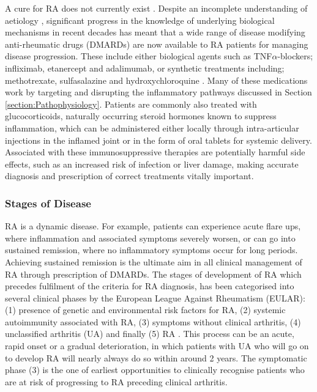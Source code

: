 \documentclass[twoside]{bhamthesis}
\theoremstyle{definition}
\begin{document}
A cure for RA does not currently exist \cite{el2002we}. Despite an incomplete understanding of aetiology \cite{el2002we}, significant progress in the knowledge of underlying biological mechanisms in recent decades has meant that a wide range of disease modifying anti-rheumatic drugs (DMARDs) are now available to RA patients for managing disease progression. These include either biological agents such as TNF$\alpha$-blockers; infliximab, etanercept and adalimumab, or synthetic treatments including; methotrexate, sulfasalazine and hydroxychloroquine \cite{smolen2010eular}. Many of these medications work by targeting and disrupting the inflammatory pathways discussed in Section \ref{section:Pathophysiology}. Patients are commonly also treated with glucocorticoids, naturally occurring steroid hormones known to suppress inflammation, which can be administered either locally through intra-articular injections in the inflamed joint or in the form of oral tablets for systemic delivery. Associated with these immunosuppressive therapies are potentially harmful side effects, such as an increased risk of infection or liver damage, making accurate diagnosis and prescription of correct treatments vitally important.

\subsubsection{Stages of Disease}

RA is a dynamic disease. For example, patients can experience acute flare ups, where inflammation and associated symptoms severely worsen, or can go into sustained remission, where no inflammatory symptoms occur for long periods. Achieving sustained remission is the ultimate aim in all clinical management of RA through prescription of DMARDs. The stages of development of RA which precedes fulfilment of the criteria for RA diagnosis, has been categorised into several clinical phases by the European League Against Rheumatism (EULAR): (1) presence of genetic and environmental risk factors for RA, (2) systemic autoimmunity associated with RA, (3) symptoms without clinical arthritis, (4) unclassified arthritis (UA) and finally (5) RA \cite{gerlag2012eular}. This process can be an acute, rapid onset or a gradual deterioration, in which patients with UA who will go on to develop RA will nearly always do so within around 2 years. The symptomatic phase (3) is the one of earliest opportunities to clinically recognise patients who are at risk of progressing to RA preceding clinical arthritis. 
\end{document}
